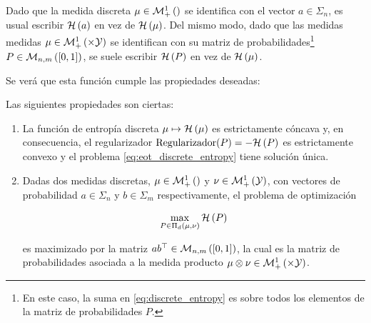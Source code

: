 Dado que la medida discreta $\mu\in\mathcal{M}_+^1\left(\right)$ se identifica con el vector $a\in\Sigma_n$, es usual escribir $\mathcal{H}\left(a\right)$ en vez de $\mathcal{H}\left(\mu\right)$. Del mismo modo, dado que las medidas medidas $\mu\in\probmeasure{\xspace\times\yspace}$ se identifican con su matriz de probabilidades\footnote{En este caso, la suma en \eqref{eq:discrete_entropy} es sobre todos los elementos de la matriz de probabilidades $P$.} $P\in\mathcal{M}_{n,m}\left([0,1]\right)$, se suele escribir $\mathcal{H}\left(P\right)$ en vez de $\mathcal{H}\left(\mu\right)$.

Se verá que esta función cumple las propiedades deseadas:

\begin{prop}
	\label{prop:discrete_entropy_properties}
	Las siguientes propiedades son ciertas:

	\begin{enumerate}
		\item La función de entropía discreta $\mu\mapsto \mathcal{H}\left(\mu\right)$ es estrictamente cóncava y, en consecuencia, el regularizador $\operatorname{Regularizador}(P)=-\mathcal{H}\left(P\right)$ es estrictamente convexo y el problema \eqref{eq:eot_discrete_entropy} tiene solución única.

		\item Dadas dos medidas discretas, $\mu\in\mathcal{M}_+^1\left(\right)$ y $\nu\in\mathcal{M}_+^1\left(\mathcal{Y}\right)$, con vectores de probabilidad $a\in\Sigma_n$ y $b\in\Sigma_m$ respectivamente, el problema de optimización

		      \begin{equation}
			      \label{eq:entropy_maximizer}
			      \max_{P\in\Pi_d(\mu,\nu)} \mathcal{H}\left(P\right)
		      \end{equation}

		      es maximizado por la matriz $ab^\top\in\mathcal{M}_{n,m}\left([0,1]\right)$, la cual es la matriz de probabilidades asociada a la medida producto $\mu\otimes\nu\in\probmeasure{\xspace\times\yspace}$.
	\end{enumerate}
\end{prop}


